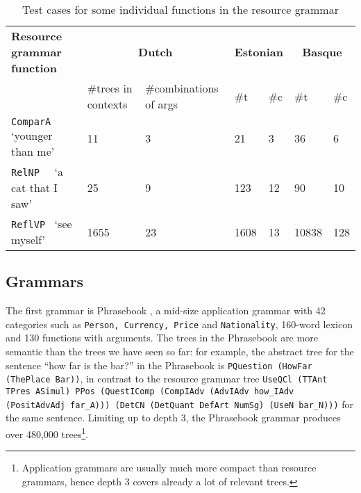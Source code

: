 \documentclass[11pt]{article}
\def\t#1{\texttt{#1}}
\begin{document}
\begin{table}[h]
\centering
\begin{tabular}{|l|ll|ll|ll|}
\hline
{\bf Resource grammar function} &\multicolumn{2}{|c}{\bf Dutch}& \multicolumn{2}{|c}{\bf Estonian} & \multicolumn{2}{|c|}{\bf Basque}  \\
                               &  \#trees in contexts & \#combinations of args
                                                                                                  &\#t
                                                                                                    
                               & \#c & \#t &
                                                                    \#c\\ \hline
\t{ComparA} `younger than me'  &  11      & 3     & 21      & 3    & 36     & 6    \\
\t{RelNP~~} `a cat that I saw' &  25      & 9     & 123     & 12 & 90     & 10   \\
 \t{ReflVP~} `see myself'      &  1655    & 23    &1608     & 13   & 10838  &  128  \\

\hline
\end{tabular}
\caption{Test cases for some individual functions in the resource grammar}
\label{results_indiv}
\end{table}

\subsection{Grammars}

The first grammar is Phrasebook \cite{ranta2010phrasebook}, a mid-size
application grammar with 42 categories such as \t{Person, Currency,
  Price} and \t{Nationality}, 160-word lexicon and 130 functions with
arguments. The trees in the Phrasebook are more semantic than the
trees we have seen so far: for example, the abstract tree for the sentence ``how far is the bar?'' in the Phrasebook is {\tt PQuestion (HowFar (ThePlace Bar))}, in contrast to the resource grammar tree
{\tt \small UseQCl (TTAnt TPres ASimul) PPos (QuestIComp
  (CompIAdv (AdvIAdv how\_IAdv (PositAdvAdj far\_A))) 
  (DetCN (DetQuant DefArt NumSg) (UseN bar\_N)))} for the same
sentence. Limiting up to depth 3, the Phrasebook grammar produces over
480,000 trees\footnote{Application grammars are usually
much more compact than resource grammars, hence depth 3 covers already
a lot of relevant trees.}.
\end{document}
